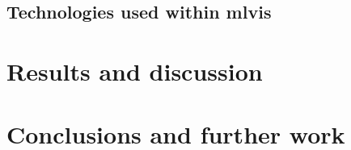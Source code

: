 \documentclass[runningheads]{llncs}
\begin{document}
\subsection{Technologies used within mlvis}

\section{Results and discussion}\label{res}



\section{Conclusions and further work}\label{con}



%
% 
% 
% 
% 
\end{document}
